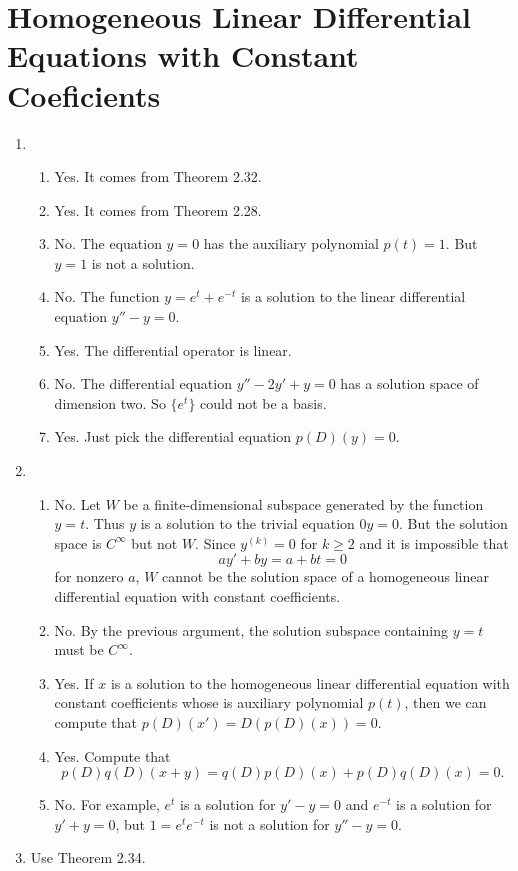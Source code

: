 \section{Homogeneous Linear Differential Equations with Constant Coeficients}
\begin{enumerate}
\item \begin{enumerate}
\item Yes. It comes from Theorem 2.32.
\item Yes. It comes from Theorem 2.28.
\item No. The equation $y=0$ has the auxiliary polynomial $p(t)=1$. But $y=1$ is not a solution.
\item No. The function $y=e^t+e^{-t}$ is a solution to the linear differential equation $y''-y=0$.
\item Yes. The differential operator is linear.
\item No. The differential equation $y''-2y'+y=0$ has a solution space of dimension two. So $\{e^t\}$ could not be a basis.
\item Yes. Just pick the differential equation $p(D)(y)=0$.
\end{enumerate}
\item \begin{enumerate}
\item No. Let $W$ be a finite-dimensional subspace generated by the function $y=t$. Thus $y$ is a solution to the trivial equation $0y=0$. But the solution space is $C^{\infty }$ but not $W$. Since $y^{(k)}=0$ for $k\geq 2$ and it is impossible that 
\[ay'+by=a+bt=0\]
for nonzero $a$, $W$ cannot be the solution space of a homogeneous linear differential equation with constant coefficients.
\item No. By the previous argument, the solution subspace containing $y=t$ must be $C^{\infty}$.
\item Yes. If $x$ is a solution to the homogeneous linear differential equation with constant coefficients whose is auxiliary polynomial $p(t)$, then we can compute that $p(D)(x')=D(p(D)(x))=0$.
\item Yes. Compute that 
\[p(D)q(D)(x+y)=q(D)p(D)(x)+p(D)q(D)(x)=0.\]
\item No. For example, $e^t$ is a solution for $y'-y=0$ and $e^{-t}$ is a solution for $y'+y=0$, but $1=e^te^{-t}$ is not a solution for $y''-y=0$.
\end{enumerate}
\item Use Theorem 2.34.\begin{enumerate}

\end{enumerate}
\end{enumerate}
